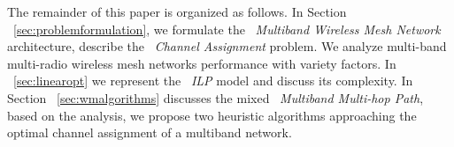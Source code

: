 The remainder of this paper is organized as follows. In Section ~\ref{sec:problemformulation}, we formulate the ~\emph{Multiband Wireless Mesh Network} architecture, describe the ~\emph{Channel Assignment} problem. We analyze multi-band multi-radio wireless mesh networks performance with variety factors. 
In ~\ref{sec:linearopt} we represent the ~\emph{ILP} model and discuss its complexity.
In Section ~\ref{sec:wmalgorithms} discusses the mixed ~\emph{Multiband Multi-hop Path}, based on the analysis, we propose two heuristic algorithms approaching the optimal channel assignment of a multiband network. 

